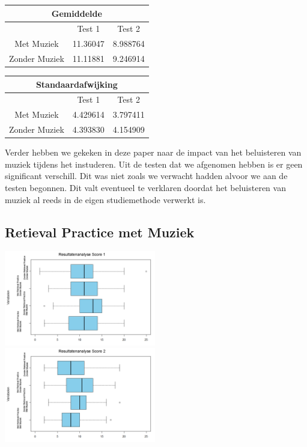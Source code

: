 \documentclass{hogent-article}
\begin{document}
	\begin{tabular}{ |c|c|c| }
	\hline
		\multicolumn{3}{|c|}{Gemiddelde} \\
	\hline
		& Test 1 & Test 2 \\
	\hline
		Met Muziek & 11.36047 & 8.988764 \\
		Zonder Muziek & 11.11881 & 9.246914 \\
	\hline
	\end{tabular}

	\begin{tabular}{ |c|c|c| }
	\hline
		\multicolumn{3}{|c|}{Standaardafwijking} \\
	\hline
		& Test 1 & Test 2 \\
	\hline
		Met Muziek & 4.429614 & 3.797411 \\
		Zonder Muziek & 4.393830 & 4.154909 \\
	\hline
	\end{tabular}

	Verder hebben we gekeken in deze paper naar de impact van het beluisteren van muziek tijdens het instuderen. Uit de testen dat we afgenomen hebben is er geen significant verschill. Dit was niet zoals we verwacht hadden alvoor we aan de testen begonnen. Dit valt eventueel te verklaren doordat het beluisteren van muziek al reeds in de eigen studiemethode verwerkt is. 
	
	\subsection{Retieval Practice met Muziek}
	\includegraphics[width=250px]{Final_boxplots_Score1}
	\includegraphics[width=250px]{Final_boxplots_Score2}
	
\end{document}
